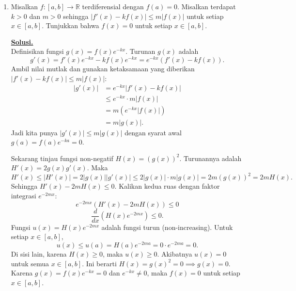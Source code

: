\documentclass[12pt,twoside]{article}
\newenvironment{solution}
{
	\par\noindent\textbf{\underline{Solusi.}}\\
}
{
	\par
}
\begin{document}
\begin{enumerate}
\begin{solution}
          Karena $V_{K+1} \subseteq V_K$ dan $\dim(V_{K+1}) = \dim(V_K)$, maka secara aljabar linier (untuk ruang dimensi hingga) disimpulkan $V_{K+1} = V_K$.

          Selanjutnya, kita gunakan induksi. Jika $V_{K+j} = V_K$, maka
          \[ V_{K+j+1} = \text{Im}(T^{K+j+1}) = T(\text{Im}(T^{K+j})) = T(V_{K+j}) = T(V_K) = V_{K+1} = V_K. \]
          Jadi, $V_{K+i} = V_K$ untuk semua $i \ge 1$.

          Terbukti terdapat $K \le n$ sehingga $Peta(T^K) = Peta(T^{K+i})$ untuk semua bilangan asli $i$.
        \end{solution}

  \item Misalkan $f:[a,b]\to \mathbb{R}$ terdiferensial dengan $f(a)=0$. Misalkan terdapat $k>0$ dan $m>0$ sehingga $|f'(x)-kf(x)|\leq m|f(x)|$ untuk setiap $x\in[a,b]$. Tunjukkan bahwa $f(x)=0$ untuk setiap $x\in[a,b]$.
        \begin{solution}
          Definisikan fungsi $g(x) = f(x) e^{-kx}$.
          Turunan $g(x)$ adalah
          \[ g'(x) = f'(x) e^{-kx} - k f(x) e^{-kx} = e^{-kx} (f'(x) - k f(x)). \]
          Ambil nilai mutlak dan gunakan ketaksamaan yang diberikan $|f'(x) - kf(x)| \le m|f(x)|$:
          \begin{align*}
            |g'(x)| & = e^{-kx} |f'(x) - kf(x)|  \\
                    & \le e^{-kx} \cdot m |f(x)| \\
                    & = m (e^{-kx} |f(x)|)       \\
                    & = m |g(x)|.
          \end{align*}
          Jadi kita punya $|g'(x)| \le m |g(x)|$ dengan syarat awal $g(a) = f(a) e^{-ka} = 0$.

          Sekarang tinjau fungsi non-negatif $H(x) = (g(x))^2$.
          Turunannya adalah $H'(x) = 2 g(x) g'(x)$.
          Maka
          \[ H'(x) \le |H'(x)| = 2 |g(x)| |g'(x)| \le 2 |g(x)| \cdot m |g(x)| = 2m (g(x))^2 = 2m H(x). \]
          Sehingga $H'(x) - 2m H(x) \le 0$.
          Kalikan kedua ruas dengan faktor integrasi $e^{-2mx}$:
          \[ e^{-2mx} (H'(x) - 2m H(x)) \le 0 \]
          \[ \frac{d}{dx} \left( H(x) e^{-2mx} \right) \le 0. \]
          Fungsi $u(x) = H(x) e^{-2mx}$ adalah fungsi turun (non-increasing).
          Untuk setiap $x \in [a,b]$,
          \[ u(x) \le u(a) = H(a) e^{-2ma} = 0 \cdot e^{-2ma} = 0. \]
          Di sisi lain, karena $H(x) \ge 0$, maka $u(x) \ge 0$.
          Akibatnya $u(x) = 0$ untuk semua $x \in [a,b]$.
          Ini berarti $H(x) = g(x)^2 = 0 \implies g(x) = 0$.
          Karena $g(x) = f(x)e^{-kx}=0$ dan $e^{-kx} \ne 0$, maka $f(x)=0$ untuk setiap $x \in [a,b]$.
        \end{solution}
\end{enumerate}
\newpage
{}
\end{document}
